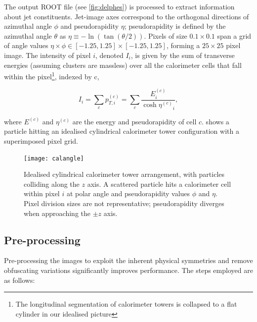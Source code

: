 \documentclass{report}
\newcommand{\pkg}[1]{\textsc{#1}}
\begin{document}
The output \pkg{ROOT} file (see \cref{fig:delphes}) is processed to extract information about jet constituents. Jet-image axes correspond to the orthogonal directions of azimuthal angle $\phi$ and pseudorapidity $\eta$; pseudorapidity is defined by the azimuthal angle $\theta$ as $\eta \equiv -\ln(\tan(\theta/2))$. Pixels of size $0.1 \times 0.1$ span a grid of angle values $\eta \times \phi \in [-1.25, 1.25]\times [-1.25, 1.25]$, forming a $25\times 25$ pixel image. The intensity of pixel $i$, denoted $I_i$, is given by the sum of transverse energies (assuming clusters are massless) over all the calorimeter cells that fall within the pixel\footnote{The longitudinal segmentation of calorimeter towers is collapsed to a flat cylinder in our idealised picture}, indexed by c, 

\begin{equation}
I_i = \sum_c p_{T, i}^{(c)} = \sum_c\frac{E^{(c)}_i}{\cosh{\eta^{(c)}}_i} ,
\label{eq:intensity}
\end{equation}

where $E^{(c)}$ and $\eta^{(c)}$ are the energy and pseudorapidity of cell $c$.  shows a particle hitting an idealised cylindrical calorimeter tower configuration with a superimposed pixel grid.

%	
%	

\begin{figure}[H]
	\centering
	\texttt{[image: calangle]}
	
	\caption{Idealised cylindrical calorimeter tower arrangement, with particles colliding along the $z$ axis. A scattered particle hits a calorimeter cell within pixel $i$ at polar angle and pseudorapidity values $\phi$ and $\eta$. Pixel division sizes are not representative; pseudorapidity diverges when approaching the $\pm z$ axis.}
	\label{fig:calangle}
	
\end{figure}

\subsection{Pre-processing}
\label{sec:preproc}

Pre-processing the images to exploit the inherent physical symmetries and remove obfuscating variations significantly improves performance. The steps employed are as follows:
\end{document}
